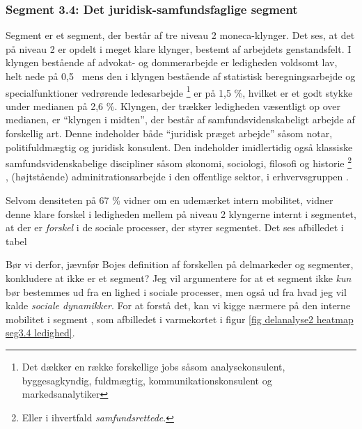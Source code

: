 %
\subsubsection{Segment 3.4: Det juridisk-samfundsfaglige segment}
%

Segment  er et segment, der består af tre niveau 2 moneca-klynger. Det ses, at det på niveau 2 er opdelt i meget klare klynger, bestemt af arbejdets genstandsfelt. I klyngen bestående af advokat- og dommerarbejde er ledigheden voldsomt lav, helt nede på 0,5 \, mens den i klyngen bestående af statistisk beregningsarbejde og specialfunktioner vedrørende ledesarbejde%
%
\footnote{ Det dækker en række forskellige jobs såsom analysekonsulent, byggesagkyndig, fuldmægtig, kommunikationskonsulent og markedsanalytiker}%
%
er på 1,5 \%, hvilket er et godt stykke under medianen på 2,6 \%. Klyngen, der trækker ledigheden væsentligt op over medianen, er “klyngen i midten”, der består af samfundsvidenskabeligt arbejde af forskellig art. Denne indeholder både “juridisk præget arbejde” såsom notar, politifuldmægtig og juridisk konsulent. Den indeholder imidlertidig også klassiske samfundsvidenskabelige discipliner såsom økonomi, sociologi, filosofi og historie%
%
\footnote{ Eller i ihvertfald \emph{samfundsrettede}.}%
%
, (højtstående) adminitrationsarbejde i den offentlige sektor, i erhvervsgruppen . 

Selvom densiteten på 67 \% vidner om en udemærket intern mobilitet, vidner denne klare forskel i ledigheden mellem på niveau 2 klyngerne internt i segmentet, at der er \emph{forskel} i de sociale processer, der styrer segmentet. Det ses afbilledet i tabel




Bør vi derfor, jævnfør Bojes definition af forskellen på delmarkeder og segmenter, konkludere at  ikke er et segment? Jeg vil argumentere for at et segment ikke \emph{kun} bør bestemmes ud fra en lighed i sociale processer, men også ud fra hvad jeg vil kalde \emph{sociale dynamikker}. For at forstå det, kan vi kigge nærmere på den interne mobilitet i segment , som afbilledet i varmekortet i figur \ref{fig delanalyse2 heatmap seg3.4 ledighed}. 

